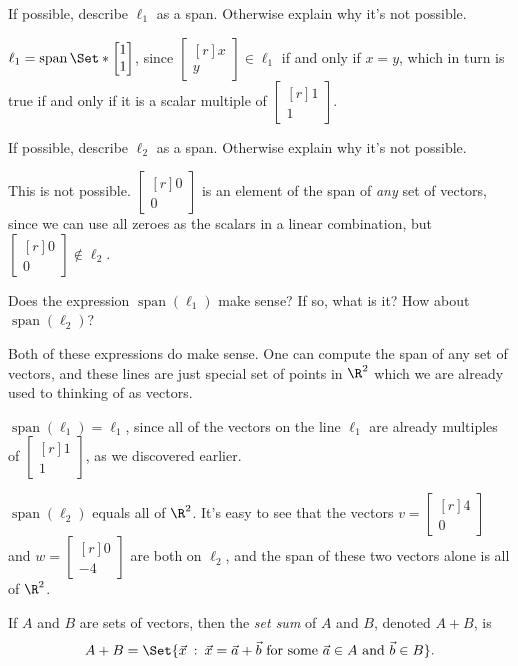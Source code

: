 \documentclass{problemset}
\DeclareMathOperator{\Span}{span}
\newcommand{\mat}[1]{\begin{bmatrix*}[r]#1\end{bmatrix*}}
\providecommand\given{}
\newcommand\SetSymbol[1][]{%
	\nonscript\::%
	\allowbreak
	\nonscript\:
	\mathopen{}}
\renewcommand\given{\SetSymbol[\delimsize]}
\begin{document}
	\begin{parts}
		\item If possible, describe $\ell_1$ as a span. Otherwise explain why
			it's not possible.
			\begin{solution}
				$\ell_1 = \Span\Set*{\mat{1\\1}}$, since $\mat{x\\y} \in \ell_1$
				if and only if $x = y$, which in turn is true if and only if it
				is a scalar multiple of $\mat{1\\1}$.
			\end{solution}
		\item If possible, describe $\ell_2$ as a span. Otherwise explain why it's
			not possible.
			\label{linesAsSpans.2}
			\begin{solution}
				This is not possible. $\mat{0\\0}$ is an element of	the span of
				\emph{any} set of vectors, since we can use all zeroes as the
				scalars in a linear combination, but $\mat{0\\0} \notin \ell_2$.
			\end{solution}
		\item Does the expression $\Span(\ell_1)$ make sense? If so, what is it?
			How about $\Span(\ell_2)$?
			\begin{solution}
				Both of these expressions do make sense. One can compute the span
				of any set of vectors, and these lines are just special set of
				points in $\R^2$ which we are already used to thinking of as vectors.

				$\Span(\ell_1) = \ell_1$, since all of the vectors on
				the line $\ell_1$ are already multiples of $\mat{1\\1}$, as we
				discovered earlier.

				$\Span(\ell_2)$ equals all of $\R^2$. It's easy to see that the
				vectors $v = \mat{4\\0}$ and $w = \mat{0\\-4}$ are both on $\ell_2$,
				and the span of these two vectors alone is all of $\R^2$.
			\end{solution}
	\end{parts}


	\begin{definition}
		If $A$ and $B$ are sets of vectors, then the \emph{set sum} of $A$
		and $B$, denoted $A+B$, is
		\[
			A+B=\Set{\vec x \given \vec x=\vec a+\vec b\text{ for some }\vec a\in A\text{ and }
			\vec b\in B}.
		\]
	\end{definition}
\end{document}
